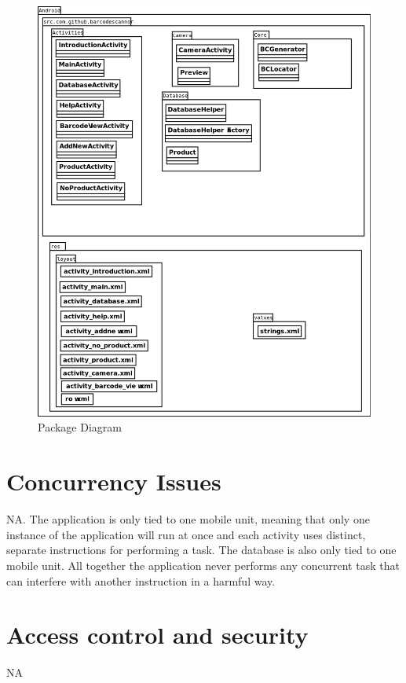 \documentclass{report}
\begin{document}
\begin{figure}[H]
		\centering
		\includegraphics[width=\textwidth]{packagediagram.png}
		\caption{Package Diagram}
		\label{fig:Package Diagram}
\end{figure}

\pagebreak

\section{Concurrency Issues}
NA. The application is only tied to one mobile unit, meaning that only one instance of the application will run at once and each activity uses distinct, separate instructions for performing a task. The database is also only tied to one mobile unit. All together the application never performs any concurrent task that can interfere with another instruction in a harmful way. 

\section{Access control and security}
NA
\end{document}
